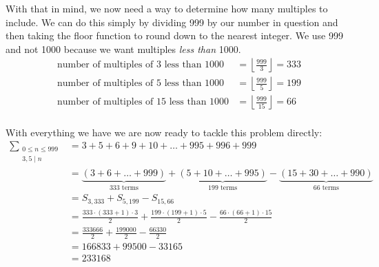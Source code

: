 \documentclass{article}
\begin{document}
With that in mind, we now need a way to determine how many multiples to
include. We can do this simply by dividing 999 by our number in question and
then taking the floor function to round down to the nearest integer. We use 999
and not 1000 because we want multiples \emph{less than} 1000.
\[ \begin{aligned}
    \text{number of multiples of 3 less than 1000}
        &= \left \lfloor \frac{999}{3} \right \rfloor = 333 \\
    \text{number of multiples of 5 less than 1000}
        &= \left \lfloor \frac{999}{5} \right \rfloor = 199 \\
    \text{number of multiples of 15 less than 1000}
        &= \left \lfloor \frac{999}{15} \right \rfloor = 66 \\
\end{aligned} \]

With everything we have we are now ready to tackle this problem directly:
\[ \begin{aligned}
    \sum_{\substack{0 \leq n \leq 999\\3,5\mid n}}
    &= 3 + 5 + 6 + 9 + 10 + \dots + 995 + 996 + 999 \\
    &= \underbrace{(3 + 6 + \dots + 999)}_{\text{333 terms}}
     + \underbrace{(5 + 10 + \dots + 995)}_{\text{199 terms}}
     - \underbrace{(15 + 30 + \dots + 990)}_{\text{66 terms}} \\
    &= S_{3,333} + S_{5,199} - S_{15,66} \\
    &= \frac{333 \cdot (333+1) \cdot 3}{2}
        + \frac{199 \cdot (199+1) \cdot 5}{2}
        - \frac{66 \cdot (66+1) \cdot 15}{2} \\
    &= \frac{333666}{2} + \frac{199000}{2} - \frac{66330}{2} \\
    &= 166833 + 99500 - 33165 \\ &= 233168
\end{aligned} \]
\end{document}
